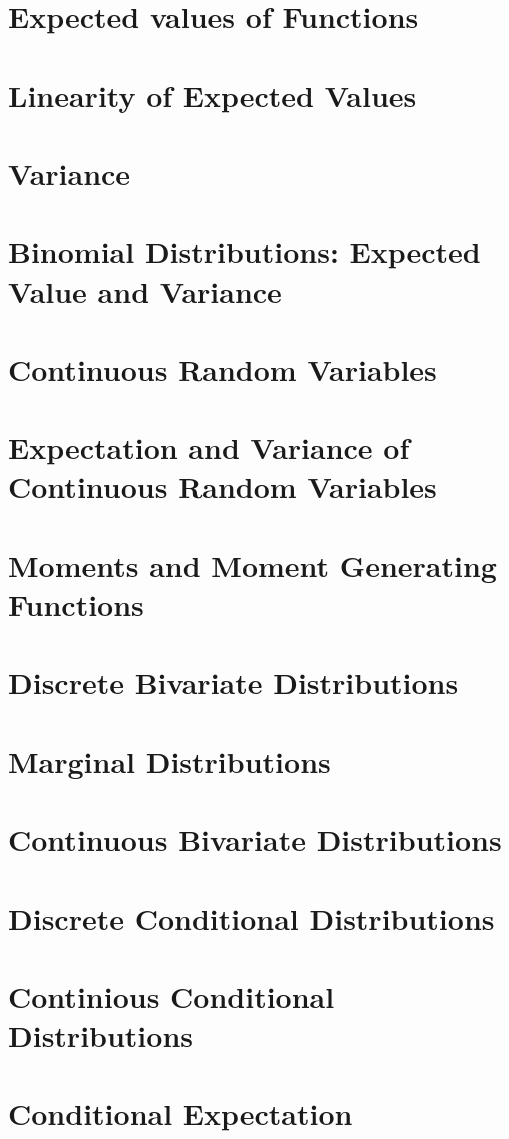 \documentclass[11pt]{article}
\begin{document}
    \section{Expected values of Functions}
    \section{Linearity of Expected Values}
    \section{Variance}
    \section{Binomial Distributions: Expected Value and Variance}
    \section{Continuous Random Variables}
    \section{Expectation and Variance of Continuous Random Variables}
    \section{Moments and Moment Generating Functions}
    \section{Discrete Bivariate Distributions}
    \section{Marginal Distributions}
    \section{Continuous Bivariate Distributions}
    \section{Discrete Conditional Distributions}
    \section{Continious Conditional Distributions}
    \section{Conditional Expectation}
\end{document}
